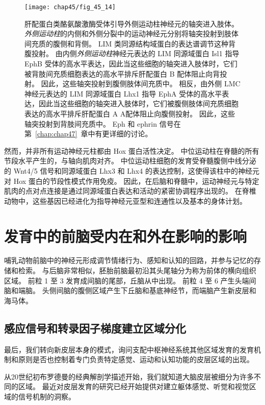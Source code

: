 \begin{figure}[htbp]
	\centering
	\texttt{[image: chap45/fig\_45\_14]}
	\caption{肝配蛋白类酪氨酸激酶受体引导外侧运动柱神经元的轴突进入肢体。
		\textit{外侧运动柱}的内侧和外侧分裂中的运动神经元分别将轴突投射到肢体间充质的腹侧和背侧。
		LIM 类同源结构域蛋白的表达谱调节这种背腹投射。 
		由内侧\textit{外侧运动柱}神经元表达的 LIM 同源域蛋白 Isl1 指导 EphB 受体的高水平表达，因此当这些细胞的轴突进入肢体时，它们被背肢间充质细胞表达的高水平排斥肝配蛋白 B 配体阻止向背投射。
		因此，这些轴突投射到腹侧肢体间充质中。
		相反，由外侧 LMC 神经元表达的 LIM 同源域蛋白 Lhx1 指导 EphA 受体的高水平表达，因此当这些细胞的轴突进入肢体时，它们被腹侧肢体间充质细胞表达的高水平排斥肝配蛋白 A A配体阻止向腹侧投射。
		因此，这些轴突投射到背肢间充质中。
		Eph 和 ephrin 信号在第~\ref{chap:chap47}~章中有更详细的讨论。}
	\label{fig:45_14}
\end{figure}


然而，并非所有运动神经元柱都由 Hox 蛋白活性决定。
中位运动柱在脊髓的所有节段水平产生的，与轴向肌肉对齐。
中位运动柱细胞的发育受脊髓腹侧中线分泌的 Wnt4/5 信号和同源域蛋白 Lhx3 和 Lhx4 的表达控制，这使得该柱中的神经元对 Hox 蛋白的节段性模式作用免疫。
因此，在后脑和脊髓中，运动神经元与特定肌肉的点对点连接是通过同源域蛋白表达和活动的紧密协调程序出现的。
在脊椎动物中，这些基因已经进化为指导神经元亚型和连通性以及基本的身体计划。



\section{发育中的前脑受内在和外在影响的影响}

哺乳动物前脑中的神经元形成调节情绪行为、感知和认知的回路，并参与记忆的存储和检索。
与后脑非常相似，胚胎前脑最初沿其头尾轴分为称为前体的横向组织区域。
前粒 1 至 3 发育成间脑的尾部，丘脑从中出现。
前粒 4 至 6 产生头端间脑和端脑。
头侧间脑的腹侧区域产生下丘脑和基底神经节，而端脑产生新皮层和海马体。



\subsection{感应信号和转录因子梯度建立区域分化}

最后，我们转向新皮层本身的模式，询问支配中枢神经系统其他区域发育的发育机制和原则是否也控制着专门负责特定感觉、运动和认知功能的皮层区域的出现。


从20世纪初布罗德曼的经典解剖学描述开始，我们就知道大脑皮层被细分为许多不同的区域。
最近对皮层发育的研究已经开始提供对建立躯体感觉、听觉和视觉区域的信号机制的洞察。


